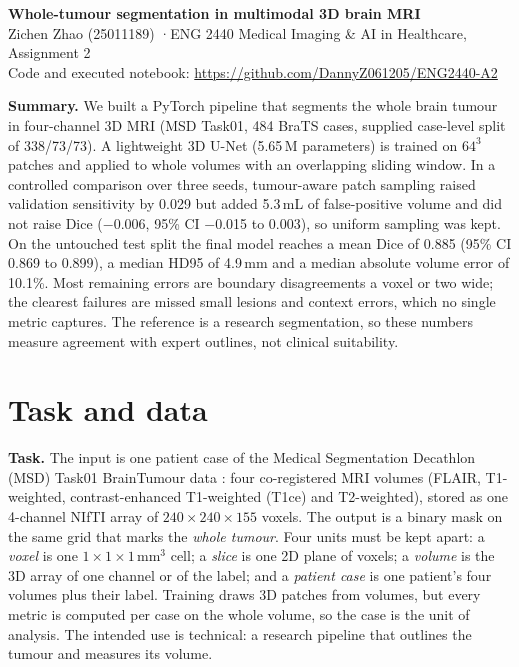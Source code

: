 \documentclass[11pt,a4paper]{article}
\newcommand{\repourl}{https://github.com/DannyZ061205/ENG2440-A2}
\begin{document}
\begin{center}
{\Large\bfseries Whole-tumour segmentation in multimodal 3D brain MRI}\\[3pt]
Zichen Zhao (25011189) \quad·\quad ENG 2440 Medical Imaging \& AI in Healthcare, Assignment 2\\[1pt]
Code and executed notebook: \url{\repourl}
\end{center}

\noindent\textbf{Summary.} We built a PyTorch pipeline that segments the whole brain tumour in four-channel 3D MRI (MSD
Task01, 484 BraTS cases, supplied case-level split of 338/73/73). A lightweight 3D U-Net (5.65\,M parameters) is trained on
$64^3$ patches and applied to whole volumes with an overlapping sliding window. In a controlled comparison over three
seeds, tumour-aware patch sampling raised validation sensitivity by 0.029 but added 5.3\,mL of false-positive volume and
did not raise Dice ($-$0.006, 95\% CI $-$0.015 to 0.003), so uniform sampling was kept. On the untouched test split the final
model reaches a mean Dice of 0.885 (95\% CI 0.869 to 0.899), a median HD95 of 4.9\,mm and a median absolute volume error
of 10.1\%. Most remaining errors are boundary disagreements a voxel or two wide; the clearest failures are missed small
lesions and context errors, which no single metric captures. The reference is a research segmentation, so these numbers
measure agreement with expert outlines, not clinical suitability.

\section{Task and data}
\textbf{Task.} The input is one patient case of the Medical Segmentation Decathlon (MSD) Task01 BrainTumour data
\cite{antonelli2022,simpson2019}: four co-registered MRI volumes (FLAIR, T1-weighted, contrast-enhanced T1-weighted (T1ce)
and T2-weighted), stored as one 4-channel NIfTI array of $240\times240\times155$ voxels. The output is a binary mask on the
same grid that marks the \emph{whole tumour}. Four units must be kept apart: a \emph{voxel} is one
$1\times1\times1$\,mm$^3$ cell; a \emph{slice} is one 2D plane of voxels; a \emph{volume} is the 3D array of one channel or
of the label; and a \emph{patient case} is one patient's four volumes plus their label. Training draws 3D patches from
volumes, but every metric is computed per case on the whole volume, so the case is the unit of analysis. The intended use
is technical: a research pipeline that outlines the tumour and measures its volume.
\end{document}
